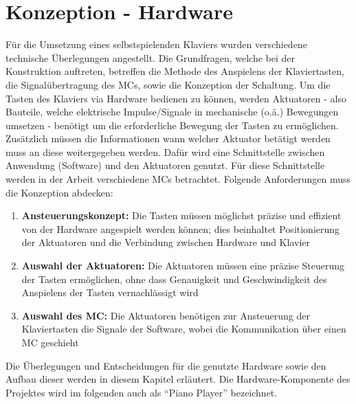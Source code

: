 
\graphicspath{ {./img/} }

\chapter{Konzeption - Hardware}\label{konzeptionHW}

Für die Umsetzung eines selbstspielenden Klaviers wurden verschiedene technische Überlegungen angestellt.
Die Grundfragen, welche bei der Konstruktion auftreten, betreffen die Methode des Anspielens der Klaviertasten, die
Signalübertragung des \ac{MC}s, sowie die Konzeption der Schaltung. \newline
Um die Tasten des Klaviers via Hardware bedienen zu können, werden Aktuatoren - also Bauteile, welche elektrische
Impulse/Signale in mechanische (o.ä.) Bewegungen umsetzen - benötigt um die erforderliche Bewegung der Tasten zu ermöglichen.
Zusätzlich müssen die Informationen wann welcher Aktuator betätigt werden muss an diese weitergegeben werden.
Dafür wird eine Schnittstelle zwischen Anwendung (Software) und den Aktuatoren genutzt. Für diese Schnittstelle werden
in der Arbeit verschiedene \ac{MC}s betrachtet.\newline
Folgende Anforderungen muss die Konzeption abdecken:
\begin{enumerate}
	\item \textbf{Ansteuerungskonzept:} Die Tasten müssen möglichst präzise und effizient von der Hardware angespielt werden können; dies beinhaltet Positionierung der Aktuatoren und die Verbindung zwischen Hardware und Klavier
	\item \textbf{Auswahl der Aktuatoren:} Die Aktuatoren müssen eine präzise Steuerung der Tasten ermöglichen, ohne dass Genauigkeit und Geschwindigkeit des Anspielens der Tasten vernachlässigt wird
	\item \textbf{Auswahl des \ac{MC}:} Die Aktuatoren benötigen zur Ansteuerung der Klaviertasten die Signale der Software, wobei die Kommunikation über einen \ac{MC} geschieht
\end{enumerate}

Die Überlegungen und Entscheidungen für die genutzte Hardware sowie den Aufbau dieser werden in diesem Kapitel erläutert.
Die Hardware-Komponente des Projektes wird im folgenden auch als \enquote{Piano Player} bezeichnet.

